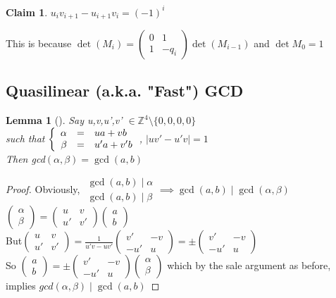 \documentclass{article}
\newtheorem{claim}{Claim}
\newtheorem{lemma}{Lemma}
\theoremstyle{definition}
\theoremstyle{remark}
\newcommand{\Lem}[3]{\begin{lemma}[#1]\label{#2}#3\end{lemma}}
\newcommand{\Proof}[1]{\begin{proof}#1\end{proof}}
\newcommand{\Z}{\mathbb{Z}}
\begin{document}
\begin{claim}
	$u_iv_{i+1} - u_{i+1} v_i = (-1)^i$
\end{claim}
This is because $\det(M_i) = \begin{pmatrix}
0 & 1 \\ 1 & -q_i
\end{pmatrix} \det(M_{i-1})$ and $\det M_0 = 1$

\subsection{Quasilinear (a.k.a. "Fast") GCD}
\Lem{}{}{Say u,v,u',v' $\in \Z^4 \setminus \{0,0,0,0\}$\\such that $\left\{\begin{array}{r c l}
	\alpha & = & ua + vb\\
	\beta & = & u'a + v'b
	\end{array}\right.$, $|uv'-u'v| = 1$\\
	Then gcd$(\alpha,\beta) = \gcd(a,b)$}
\Proof{Obviously, $\begin{array}{c}
		\gcd(a,b)\mid\alpha\\
		\gcd(a,b)\mid\beta
	\end{array} \implies \gcd(a,b)\mid\gcd(\alpha,\beta)$\\
	
	$\begin{pmatrix}
		\alpha\\\beta
	\end{pmatrix}
	= \begin{pmatrix}
		u&v\\u'&v'
	\end{pmatrix}
	\begin{pmatrix}
	a\\b
	\end{pmatrix}$\\
	
	But$\begin{pmatrix}
	u&v\\u'&v'
	\end{pmatrix}
	= \frac{1}{u'v-uv'}
	\begin{pmatrix}
	v'&-v\\-u'&u
	\end{pmatrix}
	= \pm \begin{pmatrix}
	v'&-v\\-u'&u
	\end{pmatrix}$\\
	
	So 	$\begin{pmatrix}
	a\\b
	\end{pmatrix}
	= \pm \begin{pmatrix}
	v'&-v\\-u'&u
	\end{pmatrix}
	\begin{pmatrix}
	\alpha\\\beta
	\end{pmatrix}$ which by the sale argument as before, implies $gcd(\alpha,\beta)\mid\gcd(a,b)$
		}
		
\end{document}
